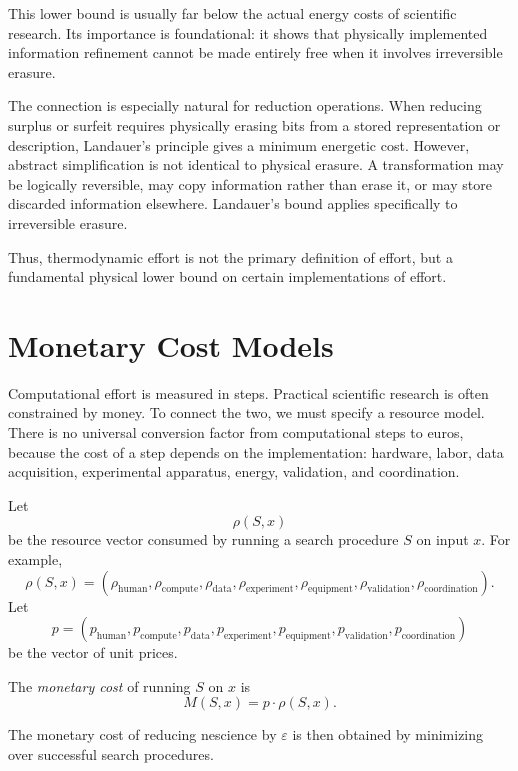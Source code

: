 This lower bound is usually far below the actual energy costs of scientific research. Its importance is foundational: it shows that physically implemented information refinement cannot be made entirely free when it involves irreversible erasure.

The connection is especially natural for reduction operations. When reducing surplus or surfeit requires physically erasing bits from a stored representation or description, Landauer's principle gives a minimum energetic cost. However, abstract simplification is not identical to physical erasure. A transformation may be logically reversible, may copy information rather than erase it, or may store discarded information elsewhere. Landauer's bound applies specifically to irreversible erasure.

Thus, thermodynamic effort is not the primary definition of effort, but a fundamental physical lower bound on certain implementations of effort.

\section{Monetary Cost Models}
\label{sec:monetary_cost_models}

Computational effort is measured in steps. Practical scientific research is often constrained by money. To connect the two, we must specify a resource model. There is no universal conversion factor from computational steps to euros, because the cost of a step depends on the implementation: hardware, labor, data acquisition, experimental apparatus, energy, validation, and coordination.

Let
\[
\rho(S,x)
\]
be the resource vector consumed by running a search procedure \(S\) on input \(x\). For example,
\[
\rho(S,x)=
(
\rho_{\mathrm{human}},
\rho_{\mathrm{compute}},
\rho_{\mathrm{data}},
\rho_{\mathrm{experiment}},
\rho_{\mathrm{equipment}},
\rho_{\mathrm{validation}},
\rho_{\mathrm{coordination}}
).
\]
Let
\[
p=
(
p_{\mathrm{human}},
p_{\mathrm{compute}},
p_{\mathrm{data}},
p_{\mathrm{experiment}},
p_{\mathrm{equipment}},
p_{\mathrm{validation}},
p_{\mathrm{coordination}}
)
\]
be the vector of unit prices.

\begin{definition}
The \emph{monetary cost} of running \(S\) on \(x\) is
\[
M(S,x)=p\cdot\rho(S,x).
\]
\end{definition}

The monetary cost of reducing nescience by \(\varepsilon\) is then obtained by minimizing over successful search procedures.

